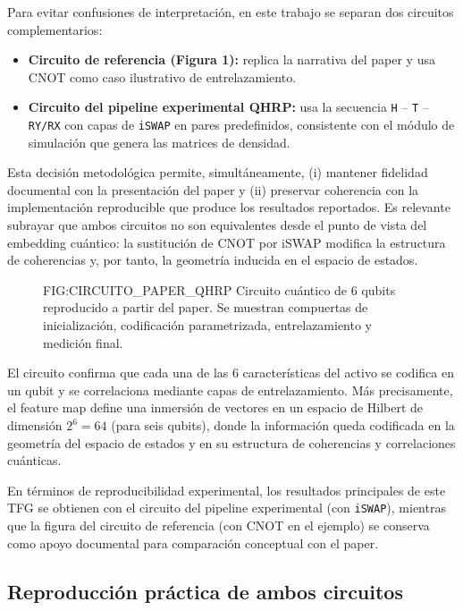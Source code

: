 Para evitar confusiones de interpretación, en este trabajo se separan dos circuitos complementarios:
\begin{itemize}
\item \textbf{Circuito de referencia (Figura 1):} replica la narrativa del paper y usa CNOT como caso ilustrativo de entrelazamiento.
\item \textbf{Circuito del pipeline experimental QHRP:} usa la secuencia \texttt{H} -- \texttt{T} -- \texttt{RY/RX} con capas de \texttt{iSWAP} en pares predefinidos, consistente con el módulo de simulación que genera las matrices de densidad.
\end{itemize}

Esta decisión metodológica permite, simultáneamente, (i) mantener fidelidad documental con la presentación del paper y (ii) preservar coherencia con la implementación reproducible que produce los resultados reportados. Es relevante subrayar que ambos circuitos no son equivalentes desde el punto de vista del embedding cuántico: la sustitución de CNOT por iSWAP modifica la estructura de coherencias y, por tanto, la geometría inducida en el espacio de estados.

\begin{figure}[Circuito cuántico reproducido del paper]{FIG:CIRCUITO_PAPER_QHRP}
{Circuito cuántico de 6 qubits reproducido a partir del paper. Se muestran compuertas de inicialización, codificación parametrizada, entrelazamiento y medición final.}
\end{figure}

El circuito confirma que cada una de las 6 características del activo se codifica en un qubit y se correlaciona mediante capas de entrelazamiento. Más precisamente, el feature map define una inmersión de vectores en un espacio de Hilbert de dimensión $2^6=64$ (para seis qubits), donde la información queda codificada en la geometría del espacio de estados y en su estructura de coherencias y correlaciones cuánticas.

En términos de reproducibilidad experimental, los resultados principales de este TFG se obtienen con el circuito del pipeline experimental (con \texttt{iSWAP}), mientras que la figura del circuito de referencia (con CNOT en el ejemplo) se conserva como apoyo documental para comparación conceptual con el paper.

\subsection{Reproducción práctica de ambos circuitos}
\label{sec:reproduccion_practica_circuitos}

